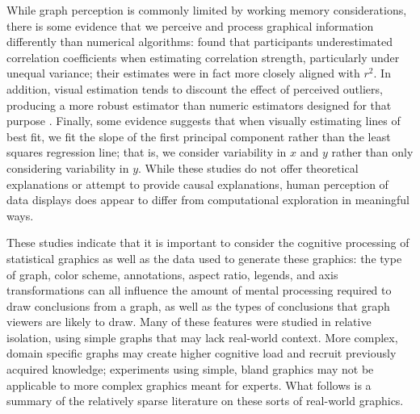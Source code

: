 \documentclass[11pt]{isuthesis}\usepackage[]{graphicx}\usepackage[]{color}
\begin{document}
While graph perception is commonly limited by working memory considerations, there is some evidence that we perceive and process graphical information differently than numerical algorithms: \citet{bobko1979perception} found that participants underestimated correlation coefficients when estimating correlation strength, particularly under unequal variance; their estimates were in fact more closely aligned with $r^2$. In addition, visual estimation tends to discount the effect of perceived outliers, producing a more robust estimator than numeric estimators designed for that purpose \citep{lewandowsky1989perception}. Finally, some evidence suggests that when visually estimating lines of best fit, we fit the slope of the first principal component rather than the least squares regression line; that is, we consider variability in $x$ and $y$ rather than only considering variability in $y$\citep{mosteller1981eye}. While these studies do not offer theoretical explanations or attempt to provide causal explanations, human perception of data displays does appear to differ from computational exploration in meaningful ways. 

These studies indicate that it is important to consider the cognitive processing of statistical graphics as well as the data used to generate these graphics: the type of graph, color scheme, annotations, aspect ratio, legends, and axis transformations can all influence the amount of mental processing required to draw conclusions from a graph, as well as the types of conclusions that graph viewers are likely to draw. Many of these features were studied in relative isolation, using simple graphs that may lack real-world context. More complex, domain specific graphs may create higher cognitive load and recruit previously acquired knowledge; experiments using simple, bland graphics may not be applicable to more complex graphics meant for experts. What follows is a summary of the relatively sparse literature on these sorts of real-world graphics. 
\end{document}

